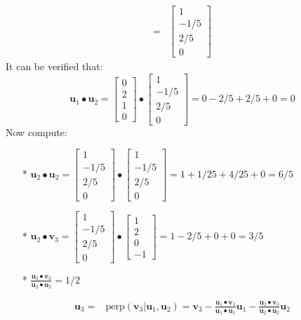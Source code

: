 \documentclass{article}
\begin{document}
\begin{description}
\begin{align*}
= & \begin{bmatrix} 1 \\ -1/5 \\ 2/5 \\ 0 \end{bmatrix} 
\end{align*}
It can be verified that:
\[\mathbf{u}_1 \bullet \mathbf{u}_2 = \begin{bmatrix} 0 \\ 2 \\ 1 \\ 0 \end{bmatrix} \bullet \begin{bmatrix} 1 \\ -1/5 \\ 2/5 \\ 0 \end{bmatrix} = 0 - 2/5 + 2/5 + 0 = 0\]
Now compute:
\begin{itemize}
\item[*] \(\mathbf{u}_2 \bullet \mathbf{u}_2 = \begin{bmatrix} 1 \\ -1/5 \\ 2/5 \\ 0 \end{bmatrix} \bullet \begin{bmatrix} 1 \\ -1/5 \\ 2/5 \\ 0 \end{bmatrix} = 1 + 1/25 + 4/25 + 0 = 6/5\)
\item[*] \(\mathbf{u}_2 \bullet \mathbf{v}_3 = \begin{bmatrix} 1 \\ -1/5 \\ 2/5 \\ 0 \end{bmatrix} \bullet \begin{bmatrix} 1 \\ 2 \\ 0 \\ -1 \end{bmatrix} = 1 - 2/5 + 0 + 0 = 3/5\)
\item[*] \(\frac{\mathbf{u}_2 \bullet \mathbf{v}_3}{\mathbf{u}_2 \bullet \mathbf{u}_2} = 1/2\)
\end{itemize}
\begin{align*}
\mathbf{u}_3 = & \text{perp}(\mathbf{v}_3 | \mathbf{u}_1, \mathbf{u}_2) = \mathbf{v}_3 - \frac{\mathbf{u}_1 \bullet \mathbf{v}_3}{\mathbf{u}_1 \bullet \mathbf{u}_1}\mathbf{u}_1 - \frac{\mathbf{u}_2 \bullet \mathbf{v}_3}{\mathbf{u}_2 \bullet \mathbf{u}_2}\mathbf{u}_2 

\end{align*}
\end{description}
\end{document}

